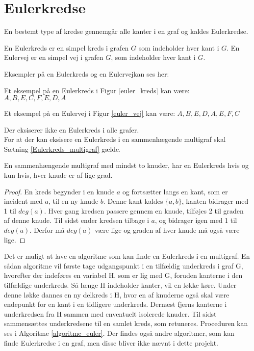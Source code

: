 \section{Eulerkredse}

En bestemt type af kredse gennemgår alle kanter i en graf og kaldes Eulerkredse. 

\begin{defn}\label{euler_def}
En Eulerkreds er en simpel kreds i grafen $G$ som indeholder hver kant i $G$.
En Eulervej er en simpel vej i grafen $G$, som indeholder hver kant i $G$.  
\end{defn}
\begin{exmp}
Eksempler på en Eulerkreds og en Eulervejkan ses her: 
\end{exmp}



\noindent Et eksempel på en Eulerkreds i Figur \ref{euler_kreds} kan være: $A,B,E,C,F,E,D,A$




\noindent Et eksempel på en Eulervej i Figur \ref{euler_vej} kan være: $A,B,E,D,A,E,F,C$

\noindent Der eksiserer ikke en Eulerkreds i alle grafer. \\

For at der kan eksisere en Eulerkreds i en sammenhægende multigraf skal Sætning \ref{Eulerkreds_multigraf} gælde. 

\begin{thm}\label{Eulerkreds_multigraf}
En sammenhængende multigraf med mindst to knuder, har en Eulerkreds hvis og kun hvis, hver knude er af lige grad.
\end{thm}

\begin{proof} 
En kreds begynder i en knude $a$ og fortsætter langs en kant, som er incident med $a$, til en ny knude $b$. 
Denne kant kaldes $\lbrace a,b \rbrace$, kanten bidrager med 1 til $deg(a)$. 
Hver gang kredsen passere gennem en knude, tilføjes 2 til graden af denne knude. 
Til sidst ender kredsen tilbage i $a$, og bidrager igen med 1 til $deg(a)$. 
Derfor må $deg(a)$ være lige og graden af hver knude må også være lige.  
\end{proof} 

\noindent Det er muligt at lave en algoritme som kan finde en Eulerkreds i en multigraf.
En sådan algoritme vil første tage udgangspunkt i en tilfældig underkreds i graf G, hvorefter der indeføres en variabel H, som er lig med G, foruden kanterne i den tilfældige underkreds. 
Så længe H indeholder kanter, vil en løkke køre. 
Under denne løkke dannes en ny delkreds i H, hvor en af knuderne også skal være endepunkt for en kant i en tidligere underkreds.
Dernæst fjerns kanterne i underkredsen fra H sammen med enventuelt isolerede knuder. 
Til sidst sammensættes underkredsene til en samlet kreds, som retuneres.
Proceduren kan ses i Algoritme \ref{algoritme_euler}.
Der findes også andre algoritmer, som kan finde Eulerkredse i en graf, men disse bliver ikke nævnt i dette projekt.\\
  

